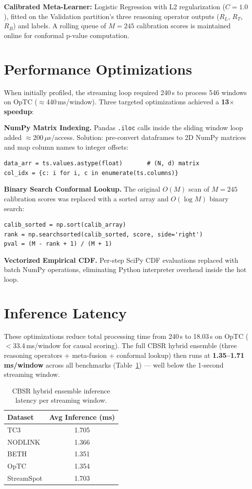 \textbf{Calibrated Meta-Learner:} Logistic Regression with L2 regularization ($C = 1.0$),
fitted on the Validation partition's three reasoning operator outputs ($R_L$, $R_T$, $R_B$)
and labels. A rolling queue of $M = 245$ calibration scores is maintained online for
conformal p-value computation.


\section{Performance Optimizations}

When initially profiled, the streaming loop required 240\,s to process 546 windows on OpTC
($\approx$440\,ms/window). Three targeted optimizations achieved a \textbf{13$\times$ speedup}:

\textbf{NumPy Matrix Indexing.} Pandas \texttt{.iloc} calls inside the sliding window loop
added $\approx$200\,$\mu$s/access. Solution: pre-convert dataframes to 2D NumPy matrices and
map column names to integer offsets:
\begin{lstlisting}
data_arr = ts.values.astype(float)       # (N, d) matrix
col_idx = {c: i for i, c in enumerate(ts.columns)}
\end{lstlisting}

\textbf{Binary Search Conformal Lookup.} The original $O(M)$ scan of $M = 245$ calibration
scores was replaced with a sorted array and $O(\log M)$ binary search:
\begin{lstlisting}
calib_sorted = np.sort(calib_array)
rank = np.searchsorted(calib_sorted, score, side='right')
pval = (M - rank + 1) / (M + 1)
\end{lstlisting}

\textbf{Vectorized Empirical CDF.} Per-step SciPy CDF evaluations replaced with batch NumPy
operations, eliminating Python interpreter overhead inside the hot loop.


\section{Inference Latency}

These optimizations reduce total processing time from 240\,s to 18.03\,s on OpTC
($<$33.4\,ms/window for causal scoring). The full CBSR hybrid ensemble (three reasoning
operators + meta-fusion + conformal lookup) then runs at \textbf{1.35--1.71\,ms/window}
across all benchmarks (Table~\ref{tab:runtime}) --- well below the 1-second streaming window.

\begin{table}[htbp]
\centering
\caption{CBSR hybrid ensemble inference latency per streaming window.}
\begin{tabular}{lc}
\toprule
\textbf{Dataset} & \textbf{Avg Inference (ms)} \\
\midrule
TC3        & 1.705 \\
NODLINK    & 1.366 \\
BETH       & 1.351 \\
OpTC       & 1.354 \\
StreamSpot & 1.703 \\
\bottomrule
\end{tabular}
\label{tab:runtime}
\end{table}

